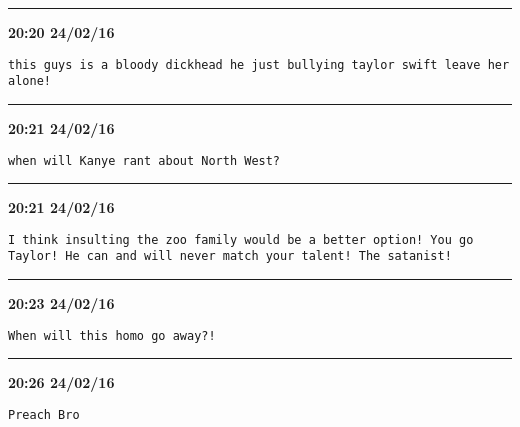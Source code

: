 \hrule%

\begin{adjustwidth}{0cm}{0cm}
\footnotesize \textbf{20:20 24/02/16}

\begin{lstlisting}[breaklines, breakatwhitespace, basicstyle=\small, frame=leftline]
this guys is a bloody dickhead he just bullying taylor swift leave her alone!
\end{lstlisting}
\end{adjustwidth}

\hrule%

\begin{adjustwidth}{0cm}{0cm}
\footnotesize \textbf{20:21 24/02/16}

\begin{lstlisting}[breaklines, breakatwhitespace, basicstyle=\small, frame=leftline]
when will Kanye rant about North West?
\end{lstlisting}
\end{adjustwidth}

\hrule%

\begin{adjustwidth}{0cm}{0cm}
\footnotesize \textbf{20:21 24/02/16}

\begin{lstlisting}[breaklines, breakatwhitespace, basicstyle=\small, frame=leftline]
I think insulting the zoo family would be a better option! You go Taylor! He can and will never match your talent! The satanist!
\end{lstlisting}
\end{adjustwidth}

\hrule%

\begin{adjustwidth}{0cm}{0cm}
\footnotesize \textbf{20:23 24/02/16}

\begin{lstlisting}[breaklines, breakatwhitespace, basicstyle=\small, frame=leftline]
When will this homo go away?!
\end{lstlisting}
\end{adjustwidth}

\hrule%

\begin{adjustwidth}{0cm}{0cm}
\footnotesize \textbf{20:26 24/02/16}

\begin{lstlisting}[breaklines, breakatwhitespace, basicstyle=\small, frame=leftline]
Preach Bro
\end{lstlisting}
\end{adjustwidth}

